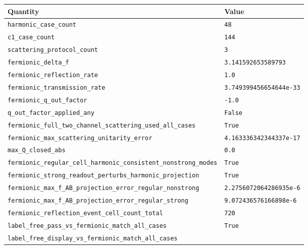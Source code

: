 \documentclass[
]{article}
\newcounter{none} %
\begin{document}
{\def\LTcaptype{none} %
\begin{longtable}[]{@{}
  >{\raggedright\arraybackslash}p{}
  >{\raggedleft\arraybackslash}p{}@{}}
\toprule\noalign{}
\begin{minipage}[b]{\linewidth}\raggedright
Quantity
\end{minipage} & \begin{minipage}[b]{\linewidth}\raggedleft
Value
\end{minipage} \\
\midrule\noalign{}
\endhead
\bottomrule\noalign{}
\endlastfoot
\texttt{harmonic\_case\_count} & \texttt{48} \\
\texttt{c1\_case\_count} & \texttt{144} \\
\texttt{scattering\_protocol\_count} & \texttt{3} \\
\texttt{fermionic\_delta\_f} & \texttt{3.141592653589793} \\
\texttt{fermionic\_reflection\_rate} & \texttt{1.0} \\
\texttt{fermionic\_transmission\_rate} &
\texttt{3.749399456654644e-33} \\
\texttt{fermionic\_q\_out\_factor} & \texttt{-1.0} \\
\texttt{q\_out\_factor\_applied\_any} & \texttt{False} \\
\texttt{fermionic\_full\_two\_channel\_scattering\_used\_all\_cases} &
\texttt{True} \\
\texttt{fermionic\_max\_scattering\_unitarity\_error} &
\texttt{4.163336342344337e-17} \\
\texttt{max\_Q\_closed\_abs} & \texttt{0.0} \\
\texttt{fermionic\_regular\_cell\_harmonic\_consistent\_nonstrong\_modes}
& \texttt{True} \\
\texttt{fermionic\_strong\_readout\_perturbs\_harmonic\_projection} &
\texttt{True} \\
\texttt{fermionic\_max\_f\_AB\_projection\_error\_regular\_nonstrong} &
\texttt{2.2756072064286935e-6} \\
\texttt{fermionic\_max\_f\_AB\_projection\_error\_regular\_strong} &
\texttt{9.072436576166898e-6} \\
\texttt{fermionic\_reflection\_event\_cell\_count\_total} &
\texttt{720} \\
\texttt{label\_free\_pass\_vs\_fermionic\_match\_all\_cases} &
\texttt{True} \\
\texttt{label\_free\_display\_vs\_fermionic\_match\_all\_cases} &

\end{longtable}}
\end{document}
